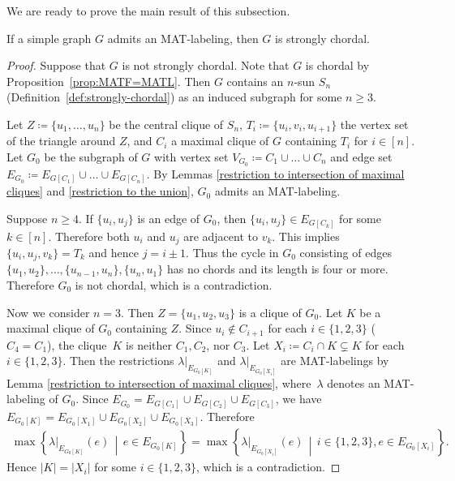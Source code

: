 \documentclass[ALCO, Unicode,published]{cedram}
\begin{document}
We are ready to prove the main result of this subsection.
\begin{theorem}
\label{thm:main-1} 
If a simple graph $G$ admits an MAT-labeling, then $G$ is strongly chordal.  
\end{theorem}
\begin{proof}
Suppose that $ G $ is not strongly chordal. 
Note that $G$ is chordal by Proposition~\ref{prop:MATF=MATL}.
Then $ G $ contains an $ n $-sun $ S_{n} $ (Definition~\ref{def:strongly-chordal}) as an induced subgraph for some $ n \geq 3 $.

Let $ Z \coloneqq \{u_{1}, \dots, u_{n}\} $ be the central clique of $ S_{n} $, $ T_{i} \coloneqq \{u_{i}, v_{i}, u_{i+1}\} $ the vertex set of the triangle around $ Z $, and $ C_{i} $ a maximal clique of $ G $ containing $ T_{i} $ for $ i \in [n]$. 
Let $ G_{0} $ be the subgraph of $ G $ with vertex set $ V_{G_{0}} \coloneqq C_{1} \cup \dots \cup C_{n} $ and edge set $ E_{G_{0}} \coloneqq E_{G[C_{1}]} \cup \dots \cup E_{G[C_{n}]} $. 
By Lemmas \ref{restriction to intersection of maximal cliques} and \ref{restriction to the union}, $ G_{0} $ admits an MAT-labeling. 

Suppose $ n \geq 4 $. 
If $ \{u_{i}, u_{j}\} $ is an edge of $ G_{0} $, then $ \{u_{i}, u_{j}\} \in E_{G[C_{k}]} $ for some $ k \in [n]$. 
Therefore  both $ u_{i} $ and $ u_{j} $ are adjacent to $ v_{k} $. 
This implies $ \{u_{i}, u_{j}, v_{k}\} = T_{k} $ and hence $ j = i \pm 1 $. 
Thus the cycle in $ G_{0} $ consisting of edges $ \{u_{1}, u_{2}\}, \dots, \{u_{n-1}, u_{n}\}, \{u_{n}, u_{1}\} $ has no chords and its length is four or more. 
Therefore $ G_{0} $ is not chordal, which is a contradiction. 

Now we consider $ n = 3 $. 
Then $ Z = \{u_{1}, u_{2}, u_{3}\} $ is a clique of $ G_{0} $. 
Let $ K $ be a maximal clique of $ G_{0} $ containing $ Z $. 
Since $ u_{i} \not\in C_{i+1} $ for each $ i \in \{1,2,3\} $  ($C_4=C_1$), the clique~$ K $ is neither $ C_{1}, C_{2} $, nor $ C_{3} $. 
Let $ X_{i} \coloneqq C_{i} \cap K \subsetneq K$ for each $ i \in \{1,2,3\} $. 
Then the restrictions $ \lambda|_{E_{G_{0}[K]}} $ and $ \lambda|_{E_{G_{0}[X_{i}]}}$ are MAT-labelings by Lemma \ref{restriction to intersection of maximal cliques}, where~$ \lambda $ denotes an MAT-labeling of $ G_{0} $. 
Since $ E_{G_{0}} = E_{G[C_{1}]} \cup E_{G[C_{2}]} \cup E_{G[C_{3}]} $, we have $ E_{G_{0}[K]} = E_{G_{0}[X_{1}]} \cup E_{G_{0}[X_{2}]} \cup E_{G_{0}[X_{3}]} $. 
Therefore 
\begin{align*}
\max\left\{\lambda|_{E_{G_{0}[K]}}(e) \, \middle| \,  e \in E_{G_{0}[K]}\right\}
= \max\left\{ \lambda|_{E_{G_{0}[X_{i}]}}(e) \, \middle| \, i \in \{1,2,3\}, e \in E_{G_{0}[X_{i}]}\right\}. 
\end{align*}
Hence $ |K| = |X_{i}| $ for some $ i \in \{1,2,3\} $, which is a contradiction. 
\end{proof}
\end{document}
